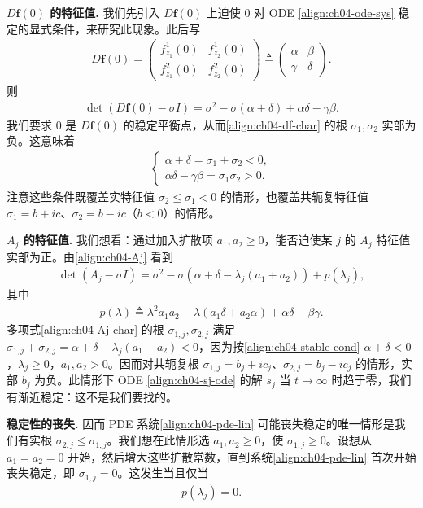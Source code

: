 \documentclass[../../main.tex]{subfiles}
\begin{document}
\textbf{$D\mathbf{f}(0)$ 的特征值.} 我们先引入 $D\mathbf{f}(0)$ 上迫使 $0$ 对 ODE \eqref{align:ch04-ode-sys} 稳定的显式条件，来研究此现象。此后写
\begin{align*}
D\mathbf{f}(0)=\begin{pmatrix}f^1_{z_1}(0)&f^1_{z_2}(0)\\ f^2_{z_1}(0)&f^2_{z_2}(0)\end{pmatrix}\triangleq\begin{pmatrix}\alpha&\beta\\ \gamma&\delta\end{pmatrix}.
\end{align*}
则
\begin{align}\label{align:ch04-df-char}
\det(D\mathbf{f}(0)-\sigma I)=\sigma^2-\sigma(\alpha+\delta)+\alpha\delta-\gamma\beta.
\end{align}
我们要求 $0$ 是 $D\mathbf{f}(0)$ 的稳定平衡点，从而\eqref{align:ch04-df-char} 的根 $\sigma_1,\sigma_2$ 实部为负。这意味着
\begin{align}\label{align:ch04-stable-cond}
\begin{cases}
\alpha+\delta=\sigma_1+\sigma_2<0,\\
\alpha\delta-\gamma\beta=\sigma_1\sigma_2>0.
\end{cases}
\end{align}
注意这些条件既覆盖实特征值 $\sigma_2\leqslant\sigma_1<0$ 的情形，也覆盖共轭复特征值 $\sigma_1=b+ic$、$\sigma_2=b-ic$（$b<0$）的情形。

\textbf{$A_j$ 的特征值.} 我们想看：通过加入扩散项 $a_1,a_2\geqslant 0$，能否迫使某 $j$ 的 $A_j$ 特征值实部为正。由\eqref{align:ch04-Aj} 看到
\begin{align}\label{align:ch04-Aj-char}
\det(A_j-\sigma I)=\sigma^2-\sigma(\alpha+\delta-\lambda_j(a_1+a_2))+p(\lambda_j),
\end{align}
其中
\begin{align}\label{align:ch06-Hopf条件}
p(\lambda)\triangleq\lambda^2 a_1a_2-\lambda(a_1\delta+a_2\alpha)+\alpha\delta-\beta\gamma.
\end{align}
多项式\eqref{align:ch04-Aj-char} 的根 $\sigma_{1,j},\sigma_{2,j}$ 满足 $\sigma_{1,j}+\sigma_{2,j}=\alpha+\delta-\lambda_j(a_1+a_2)<0$，因为按\eqref{align:ch04-stable-cond} $\alpha+\delta<0$，$\lambda_j\geqslant 0$，$a_1,a_2>0$。因而对共轭复根 $\sigma_{1,j}=b_j+ic_j$、$\sigma_{2,j}=b_j-ic_j$ 的情形，实部 $b_j$ 为负。此情形下 ODE \eqref{align:ch04-sj-ode} 的解 $s_j$ 当 $t\to\infty$ 时趋于零，我们有渐近稳定：这不是我们要找的。

\textbf{稳定性的丧失.} 因而 PDE 系统\eqref{align:ch04-pde-lin} 可能丧失稳定的唯一情形是我们有实根 $\sigma_{2,j}\leqslant\sigma_{1,j}$。我们想在此情形选 $a_1,a_2\geqslant 0$，使 $\sigma_{1,j}\geqslant 0$。设想从 $a_1=a_2=0$ 开始，然后增大这些扩散常数，直到系统\eqref{align:ch04-pde-lin} 首次开始丧失稳定，即 $\sigma_{1,j}=0$。这发生当且仅当
\begin{align}\label{align:ch04-pzero}
p(\lambda_j)=0.
\end{align}
\end{document}
